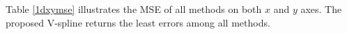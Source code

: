 Table \ref{1dxymse} illustrates the MSE of all methods on both $x$ and $y$ axes. The proposed V-spline returns the least errors among all methods.
